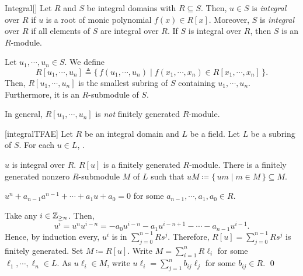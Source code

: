 \documentclass[../modern_algebra_2.tex]{subfiles}
\begin{document}
\begin{Definition}{Integral}[]
    Let \(R\) and \(S\) be integral domains with \(R \subseteq S\).
    Then, \(u \in S\) is \emph{integral} over \(R\)
    if \(u\) is a root of monic polynomial \(f(x) \in R[x]\).
    Moreover, \(S\) is \emph{integral} over \(R\)
    if all elements of \(S\) are integral over \(R\).
    If \(S\) is integral over \(R\), then \(S\) is an \(R\)-module.

    Let \(u_1, \cdots, u_n \in S\).
    We define
    \[
        R[u_1, \cdots, u_n] \triangleq \{\,f(u_1, \cdots, u_n) \mid f(x_1, \cdots, x_n) \in R[x_1, \cdots, x_n]\,\}\text{.}
    \]
    Then, \(R[u_1, \cdots, u_n]\) is the smallest subring of \(S\) containing \(u_1, \cdots, u_n\).
    Furthermore, it is an \(R\)-submodule of \(S\).
\end{Definition}

\begin{note}
    In general, \(R[u_1, \cdots, u_n]\) is \emph{not} finitely generated \(R\)-module.
\end{note}

\begin{Theorem}{}[integralTFAE]
    Let \(R\) be an integral domain and \(L\) be a field.
    Let \(L\) be a subring of \(S\). For each \(u \in L\), \TFAE.
    \begin{enumerate}[label=(\arabic*)]
        \ii \(u\) is integral over \(R\).
        \ii \(R[u]\) is a finitely generated \(R\)-module.
        \ii
        There is a finitely generated nonzero \(R\)-submodule \(M\) of \(L\)
        such that \(uM \coloneqq \{\,um \mid m \in M\,\} \subseteq M\).
    \end{enumerate}
\end{Theorem}
\begin{myclaim}[Proof]\hfill
\begin{pftfae}[labelwidth=\widthof{\(\text{(ii)} \Rightarrow \text{(iii)}\)}]
    \(u^n + a_{n-1}a^{n-1} + \cdots + a_1u + a_0 = 0\)
    for some \(a_{n-1}, \cdots, a_1, a_0 \in R\).

    Take any \(i \in \ZZ_{\ge n}\).
    Then,
    \[
        u^i = u^n u^{i-n}
        = -a_0 u^{i-n} - a_1 u^{i-n+1} - \cdots - a_{n-1}u^{i-1}\text{.}
    \]
    Hence, by induction every, \(u^i\) is in \(\sum_{j=0}^{n-1} Rs^j\).
    Therefore, \(R[u] = \sum_{j=0}^{n-1} Rs^j\) is finitely generated.
    Set \(M \coloneqq R[u]\).
    Write \(M = \sum_{i=1}^n R\ell_i\) for some \(\ell_1, \cdots, \ell_n \in L\).
    As \(u\ell_i \in M\),
    write \(u\ell_i = \sum_{j=1}^n b_{ij}\ell_j\) for some \(b_{ij} \in R\).
    \qed
\end{pftfae}
\end{myclaim}
\end{document}

